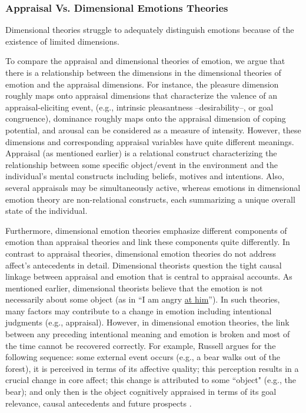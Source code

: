\documentclass[12pt]{report}
\begin{document}
\subsubsection{Appraisal Vs. Dimensional Emotions Theories}

Dimensional theories struggle to adequately distinguish emotions because of the
existence of limited dimensions.

To compare the appraisal and dimensional theories of emotion, we argue that
there is a relationship between the dimensions in the dimensional theories of
emotion and the appraisal dimensions. For instance, the pleasure dimension
roughly maps onto appraisal dimensions that characterize the valence of an
appraisal-eliciting event, (e.g., intrinsic pleasantness --desirability--, or
goal congruence), dominance roughly maps onto the appraisal dimension of coping
potential, and arousal can be considered as a measure of intensity. However,
these dimensions and corresponding appraisal variables have quite different
meanings. Appraisal (as mentioned earlier) is a relational construct
characterizing the relationship between some specific object/event in the
environment and the individual's mental constructs including beliefs, motives
and intentions. Also, several appraisals may be simultaneously active, whereas
emotions in dimensional emotion theory are non-relational constructs, each
summarizing a unique overall state of the individual.

Furthermore, dimensional emotion theories emphasize different components of
emotion than appraisal theories and link these components quite differently.
In contrast to appraisal theories, dimensional emotion theories do not address
affect's antecedents in detail. Dimensional theorists question the tight causal
linkage between appraisal and emotion that is central to appraisal accounts. As
mentioned earlier, dimensional theorists believe that the emotion is not
necessarily about some object (as in ``I am angry \underline{at him}''). In such
theories, many factors may contribute to a change in emotion including
intentional judgments (e.g., appraisal). However, in dimensional emotion
theories, the link between any preceding intentional meaning and emotion is
broken and most of the time cannot be recovered correctly. For example, Russell
argues for the following sequence: some external event occurs (e.g., a bear
walks out of the forest), it is perceived in terms of its affective quality;
this perception results in a crucial change in core affect; this change is
attributed to some ``object" (e.g., the bear); and only then is the object
cognitively appraised in terms of its goal relevance, causal antecedents and
future prospects \cite{marsella:computational-models}.
\end{document}
